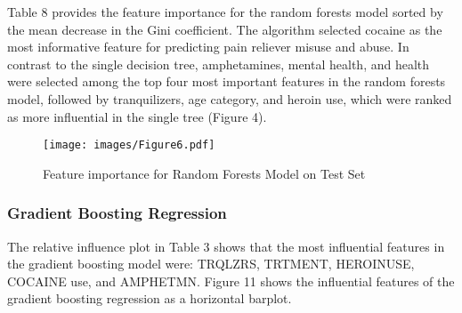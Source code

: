 \documentclass[sigconf]{acmart}
\begin{document}
Table 8 provides the feature importance for 
the random forests model sorted by the mean decrease in the Gini coefficient. 
The algorithm selected cocaine as the most informative feature for predicting 
pain reliever misuse and abuse. In contrast to the single decision tree, 
amphetamines, mental health, and health were selected among the top four most 
important features in the random forests model, followed by tranquilizers, 
age category, and heroin use, which were ranked as more influential in the 
single tree (Figure 4). 

\begin{figure}[!ht]
  \centering\texttt{[image: images/Figure6.pdf]}
  \caption{Feature importance for Random Forests Model on Test Set}
  \label{f:Figure6}
\end{figure}




\subsubsection{Gradient Boosting Regression}

The relative influence plot in Table 3 shows that the most 
influential features in the gradient boosting model were: TRQLZRS, TRTMENT,
HEROINUSE, COCAINE use, and AMPHETMN. Figure 11 shows the influential 
features of the gradient boosting regression as a horizontal barplot. 

\end{document}
